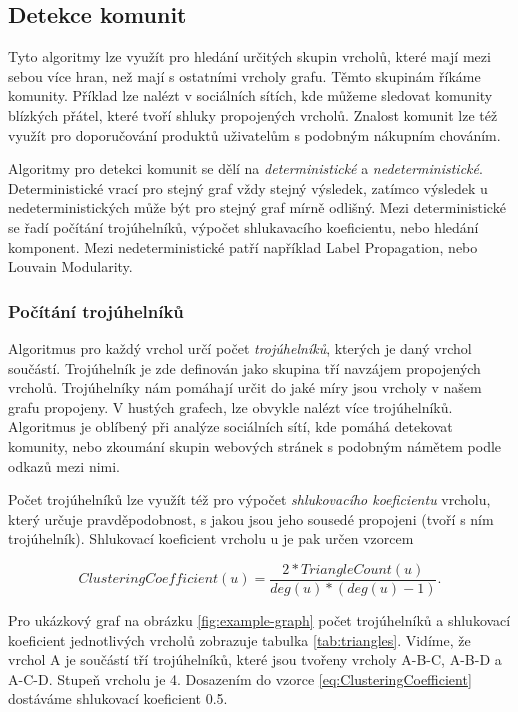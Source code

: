 \documentclass[
  program=infoi,
  biblatex=true,
  sourcecodes=true,
  figures=true,
  glossaries=false,
  index
]{kidiplom}
\begin{document}
\subsection{Detekce komunit}
Tyto algoritmy lze využít pro hledání určitých skupin vrcholů, které mají mezi sebou více hran, než mají s ostatními vrcholy grafu. Těmto skupinám říkáme komunity. Příklad lze nalézt v sociálních sítích, kde můžeme sledovat komunity blízkých přátel, které tvoří shluky propojených vrcholů. Znalost komunit lze též využít pro doporučování produktů uživatelům s podobným nákupním chováním.

Algoritmy pro detekci komunit se dělí na \textit{deterministické} a \textit{nedeterministické}. Deterministické vrací pro stejný graf vždy stejný výsledek, zatímco výsledek u nedeterministických může být pro stejný graf mírně odlišný. Mezi deterministické se řadí počítání trojúhelníků, výpočet shlukavacího koeficientu, nebo hledání komponent. Mezi nedeterministické patří například Label Propagation, nebo Louvain Modularity.

\subsubsection{Počítání trojúhelníků}
Algoritmus pro každý vrchol určí počet \textit{trojúhelníků}, kterých je daný vrchol součástí. Trojúhelník je zde definován jako skupina tří navzájem propojených vrcholů. Trojúhelníky nám pomáhají určit do jaké míry jsou vrcholy v našem grafu propojeny. V hustých grafech, lze obvykle nalézt více trojúhelníků. Algoritmus je oblíbený při analýze sociálních sítí, kde pomáhá detekovat komunity, nebo zkoumání skupin webových stránek s podobným námětem podle odkazů mezi nimi.

Počet trojúhelníků lze využít též pro výpočet \textit{shlukovacího koeficientu} vrcholu, který určuje pravděpodobnost, s jakou jsou jeho sousedé propojeni (tvoří s ním trojúhelník). Shlukovací koeficient vrcholu u je pak určen vzorcem

\begin{equation} 
\label{eq:ClusteringCoefficient}
ClusteringCoefficient(u) = \frac{2 * TriangleCount(u)}{deg(u) * (deg(u) - 1)}.
\end{equation}

Pro ukázkový graf na obrázku \ref{fig:example-graph} počet trojúhelníků a shlukovací koeficient jednotlivých vrcholů zobrazuje tabulka \ref{tab:triangles}. Vidíme, že vrchol A je součástí tří trojúhelníků, které jsou tvořeny vrcholy A-B-C, A-B-D a A-C-D. Stupeň vrcholu je 4. Dosazením do vzorce \ref{eq:ClusteringCoefficient} dostáváme shlukovací koeficient 0.5.
\end{document}
